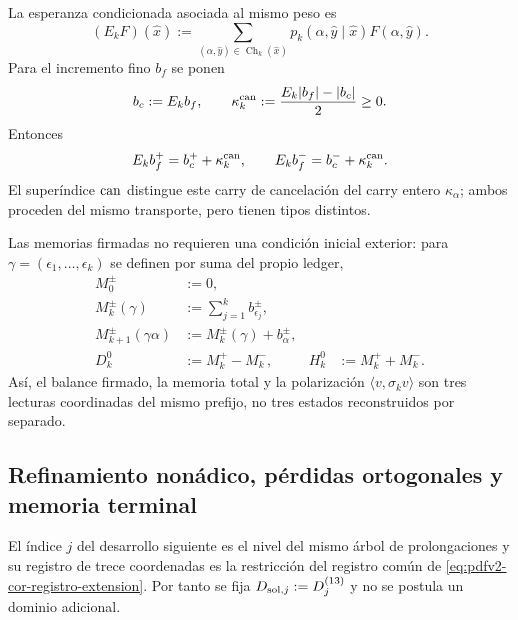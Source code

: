 La esperanza condicionada asociada al mismo peso es
\begin{equation}
\label{eq:pdfv2-cor-esperanza-comun}
 (E_kF)(\widehat x):=
 \sum_{(\alpha,\widehat y)\in\operatorname{Ch}_k(\widehat x)}
 p_k(\alpha,\widehat y\mid\widehat x)F(\alpha,\widehat y).
\end{equation}
Para el incremento fino \(b_f\) se ponen
\begin{equation}
\label{eq:pdfv2-cor-kappa-jensen}
 b_c:=E_kb_f,\qquad
 \kappa_k^{\rm can}:=\frac{E_k|b_f|-|b_c|}{2}\geq0.
\end{equation}
Entonces
\begin{equation}
\label{eq:pdfv2-cor-jensen-hojas}
 E_kb_f^+=b_c^++\kappa_k^{\rm can},\qquad
 E_kb_f^-=b_c^-+\kappa_k^{\rm can}.
\end{equation}
El superíndice \({\rm can}\) distingue este carry de cancelación del carry
entero \(\kappa_\alpha\); ambos proceden del mismo transporte, pero tienen
tipos distintos.

Las memorias firmadas no requieren una condición inicial exterior: para
\(\gamma=(\epsilon_1,\ldots,\epsilon_k)\) se definen por suma del propio
ledger,
\begin{equation}
\label{eq:pdfv2-cor-memorias}
 \begin{aligned}
 M_0^\pm&:=0,\\
 M_k^\pm(\gamma)&:=\sum_{j=1}^k b_{\epsilon_j}^\pm,\\
 M_{k+1}^\pm(\gamma\alpha)&:=M_k^\pm(\gamma)+b_\alpha^\pm,\\
 D_k^0&:=M_k^+-M_k^-, &
 H_k^0&:=M_k^++M_k^-.
 \end{aligned}
\end{equation}
Así, el balance firmado, la memoria total y la polarización
\(\langle v,\sigma_kv\rangle\) son tres lecturas coordinadas del mismo
prefijo, no tres estados reconstruidos por separado.

\subsection{Refinamiento nonádico, pérdidas ortogonales y memoria terminal}
El índice \(j\) del desarrollo siguiente es el nivel del mismo árbol de
prolongaciones y su registro de trece coordenadas es la restricción del
registro común de \eqref{eq:pdfv2-cor-registro-extension}. Por tanto se fija
\(D_{{\rm sol},j}:=D_j^{(13)}\) y no se postula un dominio adicional.
\begingroup
  \let\section\subsection
  
\endgroup

